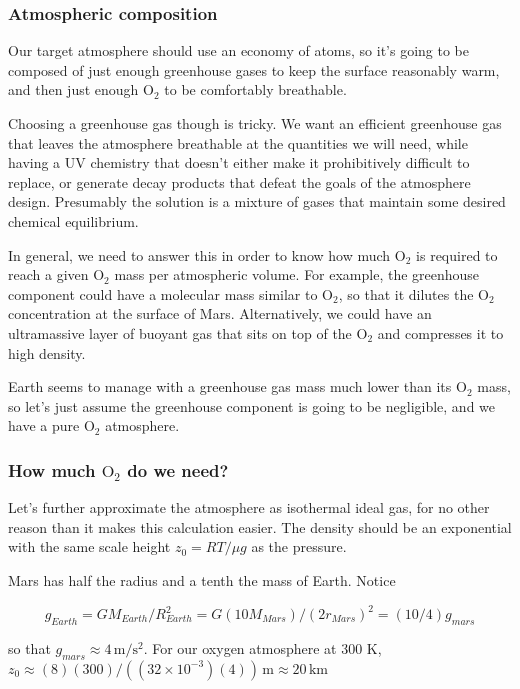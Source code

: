\documentclass[12pt]{article}
\begin{document}
\subsubsection{Atmospheric composition}

Our target atmosphere should use an economy of atoms, so it's going to be composed of just enough greenhouse gases to keep the surface reasonably warm, and then just enough \(\mathrm{O}_2\) to be comfortably breathable.

Choosing a greenhouse gas though is tricky. We want an efficient greenhouse gas that leaves the atmosphere breathable at the quantities we will need, while having a UV chemistry that doesn't either make it prohibitively difficult to replace, or generate decay products that defeat the goals of the atmosphere design. Presumably the solution is a mixture of gases that maintain some desired chemical equilibrium.

In general, we need to answer this in order to know how much \(\mathrm{O}_2\) is required to reach a given \(\mathrm{O}_2\) mass per atmospheric volume. For example, the greenhouse component could have a molecular mass similar to \(\mathrm{O}_2\), so that it dilutes the \(\mathrm{O}_2\) concentration at the surface of Mars. Alternatively, we could have an ultramassive layer of buoyant gas that sits on top of the \(\mathrm{O}_2\) and compresses it to high density.

Earth seems to manage with a greenhouse gas mass much lower than its \(\mathrm{O}_2\) mass, so let's just assume the greenhouse component is going to be negligible, and we have a pure \(\mathrm{O}_2\) atmosphere. 

\subsubsection{How much \(\mathrm{O}_2\) do we need?}

Let's further approximate the atmosphere as isothermal ideal gas, for no other reason than it makes this calculation easier. The density should be an exponential with the same scale height \(z_0 = RT/\mu g\) as the pressure.

Mars has half the radius and a tenth the mass of Earth. Notice

\[g_{Earth} = GM_{Earth}/R_{Earth}^2 = G(10 M_{Mars})/(2r_{Mars})^2 = (10/4)g_{mars} \]

so that \(g_{mars} \approx 4 \, \mathrm{m} / \mathrm{s}^2\). For our oxygen atmosphere at 300 K, \(z_0 \approx (8)(300)/((32\times10^{-3})(4)) \,\mathrm{m} \approx 20 \,\mathrm{km} \)
\end{document}
